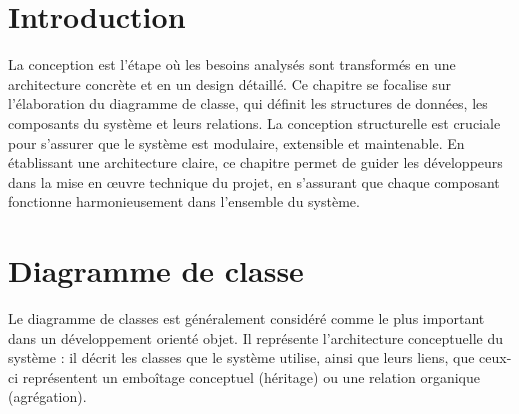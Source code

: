 \documentclass[edit,12pt,a4paper,ChapStyle,oneside,doubleinterligne]{report}
\begin{document}
\section{Introduction}
La conception est l'étape où les besoins analysés sont transformés en une architecture concrète et en un design détaillé. Ce chapitre se focalise sur l'élaboration du diagramme de classe, qui définit les structures de données, les composants du système et leurs relations. La conception structurelle est cruciale pour s'assurer que le système est modulaire, extensible et maintenable. En établissant une architecture claire, ce chapitre permet de guider les développeurs dans la mise en œuvre technique du projet, en s'assurant que chaque composant fonctionne harmonieusement dans l'ensemble du système.
\section{Diagramme de classe}
Le diagramme de classes est généralement considéré comme le plus important dans
un développement orienté objet. Il représente l’architecture conceptuelle du système : il
décrit les classes que le système utilise, ainsi que leurs liens, que ceux-ci représentent un
emboîtage conceptuel (héritage) ou une relation organique (agrégation).
\end{document}
